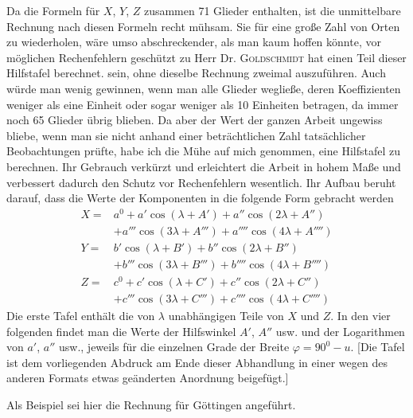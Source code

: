 Da die Formeln für $X$, $Y$, $Z$ zusammen 71 Glieder enthalten, ist die unmittelbare Rechnung nach diesen Formeln recht mühsam. Sie für eine große Zahl von Orten zu wiederholen, wäre umso abschreckender, als man kaum hoffen könnte, vor möglichen Rechenfehlern geschützt zu
\expandafter\def\csname HistoricalNoteText19\endcsname{Herr Dr. \textsc{Goldschmidt} hat einen Teil dieser Hilfstafel berechnet.}
sein, ohne dieselbe Rechnung zweimal auszuführen. Auch würde man wenig gewinnen, wenn man alle Glieder wegließe, deren Koeffizienten weniger als eine Einheit oder sogar weniger als 10 Einheiten betragen, da immer noch 65 Glieder übrig blieben. Da aber der Wert der ganzen Arbeit ungewiss bliebe, wenn man sie nicht anhand einer beträchtlichen Zahl tatsächlicher Beobachtungen prüfte, habe ich die Mühe auf mich genommen, eine Hilfstafel zu berechnen. Ihr Gebrauch verkürzt und erleichtert die Arbeit in hohem Maße und verbessert dadurch den Schutz vor Rechenfehlern wesentlich. Ihr Aufbau beruht darauf, dass die Werte der Komponenten in die folgende Form gebracht werden
\[
\begin{aligned}
X={}&a^0+a'\cos(\lambda+A')+a''\cos(2\lambda+A'')\\
&+a'''\cos(3\lambda+A''')+a''''\cos(4\lambda+A'''')\\
Y={}&b'\cos(\lambda+B')+b''\cos(2\lambda+B'')\\
&+b'''\cos(3\lambda+B''')+b''''\cos(4\lambda+B'''')\\
Z={}&c^0+c'\cos(\lambda+C')+c''\cos(2\lambda+C'')\\
&+c'''\cos(3\lambda+C''')+c''''\cos(4\lambda+C'''')
\end{aligned}
\]
Die erste Tafel enthält die von $\lambda$ unabhängigen Teile von $X$ und $Z$. In den vier folgenden findet man die Werte der Hilfswinkel $A'$, $A''$ usw. und der Logarithmen von $a'$, $a''$ usw., jeweils für die einzelnen Grade der Breite $\varphi=90^0-u$. [Die Tafel ist dem vorliegenden Abdruck am Ende dieser Abhandlung in einer wegen des anderen Formats etwas geänderten Anordnung beigefügt.]

Als Beispiel sei hier die Rechnung für Göttingen angeführt.

